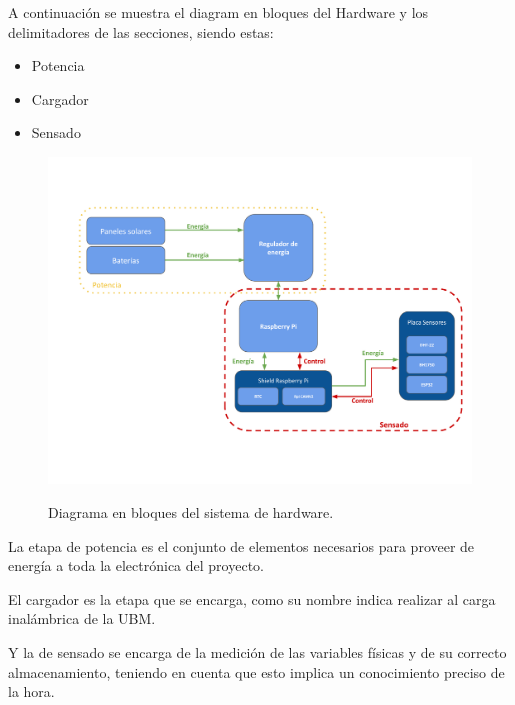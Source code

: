 A continuaci\'on se muestra el diagram en bloques del Hardware y los delimitadores de las secciones, siendo estas:
\begin{itemize}
\item Potencia
\item Cargador
\item Sensado
\end{itemize}

\begin{figure}[H]
	\centering
	\includegraphics[width=0.7\linewidth]{ImagenesIngenieria de Detalle/DiagramaHardwareMarcado}
	\label{fig:diagrama_hardware}
	\caption{Diagrama en bloques del sistema de hardware.}
\end{figure}
La etapa de potencia es el conjunto de elementos necesarios para proveer de energ\'ia a toda la electr\'onica del proyecto.

El cargador es la etapa que se encarga, como su nombre indica realizar al carga inal\'ambrica de la UBM.

Y la de sensado se encarga de la medici\'on de las variables f\'isicas y de su correcto almacenamiento, teniendo en cuenta que esto implica un conocimiento preciso de la hora.

